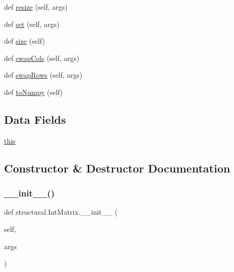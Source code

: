 \begin{DoxyCompactItemize}
\item 
def \hyperlink{classstructural_1_1_int_matrix_a5b99795b53fc99f2209d3a66e7ada748}{resize} (self, args)
\item 
def \hyperlink{classstructural_1_1_int_matrix_ab3ba0009bcf23238283990dfc762a58c}{set} (self, args)
\item 
def \hyperlink{classstructural_1_1_int_matrix_a0aeffde169eb646f971feee2a594835d}{size} (self)
\item 
def \hyperlink{classstructural_1_1_int_matrix_a7fcaccfa70f408fbd3ab36e59d9940a7}{swap\+Cols} (self, args)
\item 
def \hyperlink{classstructural_1_1_int_matrix_af7628ab81c7f691cfcbe447a559813ee}{swap\+Rows} (self, args)
\item 
def \hyperlink{classstructural_1_1_int_matrix_a71e05123364f76b39b1910b76ab0dd51}{to\+Numpy} (self)
\end{DoxyCompactItemize}
\subsection*{Data Fields}
\begin{DoxyCompactItemize}
\item 
\hyperlink{classstructural_1_1_int_matrix_a522d656248c2c15fc7ff9f46e994bdad}{this}
\end{DoxyCompactItemize}


\subsection{Constructor \& Destructor Documentation}
\mbox{\label{classstructural_1_1_int_matrix_a1f9dbf8658e1a20a3047a8ae5115d563}} 
\subsubsection{\texorpdfstring{\+\_\+\+\_\+init\+\_\+\+\_\+()}{\_\_init\_\_()}}
{\footnotesize\ttfamily def structural.\+Int\+Matrix.\+\_\+\+\_\+init\+\_\+\+\_\+ (\begin{DoxyParamCaption}\item[{}]{self,  }\item[{}]{args }\end{DoxyParamCaption})}



